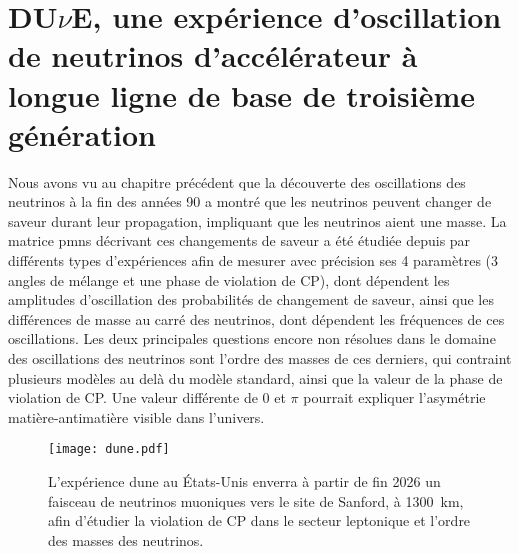 

\chapter[\texorpdfstring{DU$\nu$E}{DUNE}]{\texorpdfstring{DU$\nu$E}{DUNE}, une expérience d'oscillation de neutrinos d'accélérateur à longue ligne de base de troisième génération}\label{chap::2}

  Nous avons vu au chapitre précédent que la découverte des oscillations des neutrinos à la fin des années 90 a montré que les neutrinos peuvent changer de saveur durant leur propagation, impliquant que les neutrinos aient une masse. La matrice \gls{pmns} décrivant ces changements de saveur a été étudiée depuis par différents types d'expériences afin de mesurer avec précision ses 4 paramètres (3 angles de mélange et une phase de violation de CP), dont dépendent les amplitudes d'oscillation des probabilités de changement de saveur, ainsi que les différences de masse au carré des neutrinos, dont dépendent les fréquences de ces oscillations. Les deux principales questions encore non résolues dans le domaine des oscillations des neutrinos sont l'ordre des masses de ces derniers, qui contraint plusieurs modèles au delà du modèle standard, ainsi que la valeur de la phase de violation de CP. Une valeur différente de 0 et $\pi$ pourrait expliquer l'asymétrie matière-antimatière visible dans l'univers.

  \begin{figure}[htbp]
    \texttt{[image: dune.pdf]}
    \caption[L'expérience DU$\nu$E]{\label{fig::dune}L'expérience \acrshort{dune} au États-Unis enverra à partir de fin 2026 un faisceau de neutrinos muoniques vers le site de Sanford, à \SI{1300}{\kilo\meter}, afin d'étudier la violation de CP dans le secteur leptonique et l'ordre des masses des neutrinos.}
  \end{figure}

